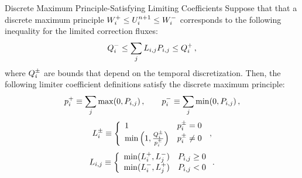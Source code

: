 \begin{theorem}{Discrete Maximum Principle-Satisfying Limiting Coefficients}
   Suppose that that a discrete maximum principle
   $W_i^+\le U_i^{n+1}\le W_i^-$
   corresponds to the following inequality for the limited correction fluxes:
   \begin{equation}
      \limitedfluxbound_i^- \le \limitedfluxsumi \le \limitedfluxbound_i^+ \eqc
   \end{equation}
   where $Q_i^\pm$ are bounds that depend on the temporal
   discretization. Then,
   the following limiter coefficient definitions satisfy the discrete maximum
   principle:
   \begin{equation}\label{eq:flux_sums}
      \correctionfluxletter_i^+ \equiv \sumj\max(0,\correctionfluxij) \eqc\qquad
      \correctionfluxletter_i^- \equiv \sumj\min(0,\correctionfluxij) \eqc
   \end{equation}
   \begin{equation}\label{eq:single_node_limiting_coefficients}
      L_i^\pm \equiv\left\{
         \begin{array}{l l}
            1 & p_i^\pm = 0\\
            \min\left(1,\frac{Q_i^\pm}
              {p_i^\pm}\right) & p_i^\pm
              \ne 0
         \end{array}
         \right. \,,
   \end{equation}
   \begin{equation}\label{eq:limiting_coefficients}
      \limiterletter\ij \equiv\left\{
         \begin{array}{l l}
            \min(\limiterletter_i^+,\limiterletter_j^-)
              & \correctionfluxij \geq 0\\
            \min(\limiterletter_i^-,\limiterletter_j^+)
              & \correctionfluxij < 0
         \end{array}
         \right..
   \end{equation}  
\end{theorem}

